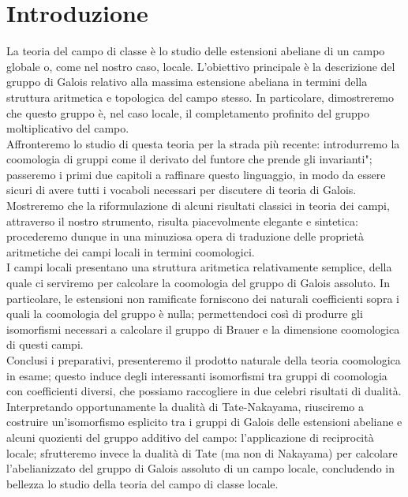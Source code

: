 \chapter*{Introduzione}

La teoria del campo di classe è lo studio delle estensioni abeliane di un campo globale o, come nel nostro caso, locale. L'obiettivo principale è la descrizione del gruppo di Galois relativo alla massima estensione abeliana in termini della struttura aritmetica e topologica del campo stesso. In particolare, dimostreremo che questo gruppo è, nel caso locale, il completamento profinito del gruppo moltiplicativo del campo. \\

Affronteremo lo studio di questa teoria per la strada più recente: introdurremo la coomologia di gruppi come il derivato del funtore che \leftquote prende gli invarianti"; passeremo i primi due capitoli a raffinare questo linguaggio, in modo da essere sicuri di avere tutti i vocaboli necessari per discutere di teoria di Galois. Mostreremo che la riformulazione di alcuni risultati classici in teoria dei campi, attraverso il nostro strumento, risulta piacevolmente elegante e sintetica: procederemo dunque in una minuziosa opera di traduzione delle proprietà aritmetiche dei campi locali in termini coomologici. \\

I campi locali presentano una struttura aritmetica relativamente semplice, della quale ci serviremo per calcolare la coomologia del gruppo di Galois assoluto. In particolare, le estensioni non ramificate forniscono dei naturali coefficienti sopra i quali la coomologia del gruppo è nulla; permettendoci così di produrre gli isomorfismi necessari a calcolare il gruppo di Brauer e la dimensione coomologica di questi campi. \\

Conclusi i preparativi, presenteremo il prodotto naturale della teoria coomologica in esame; questo induce degli interessanti isomorfismi tra gruppi di coomologia con coefficienti diversi, che possiamo raccogliere in due celebri risultati di dualità. Interpretando opportunamente la dualità di Tate-Nakayama, riusciremo a costruire un'isomorfismo esplicito tra i gruppi di Galois delle estensioni abeliane e alcuni quozienti del gruppo additivo del campo: l'applicazione di reciprocità locale; sfrutteremo invece la dualità di Tate (ma non di Nakayama) per calcolare l'abelianizzato del gruppo di Galois assoluto di un campo locale, concludendo in bellezza lo studio della teoria del campo di classe locale. \\




\vfill\break
